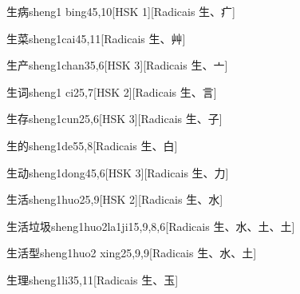 \begin{entry}{生病}{sheng1 bing4}{5,10}[HSK 1][Radicais ⽣、⽧]
\end{entry}

\begin{entry}{生菜}{sheng1cai4}{5,11}[Radicais ⽣、⾋]
\end{entry}

\begin{entry}{生产}{sheng1chan3}{5,6}[HSK 3][Radicais ⽣、⼇]
\end{entry}

\begin{entry}{生词}{sheng1 ci2}{5,7}[HSK 2][Radicais ⽣、⾔]
\end{entry}

\begin{entry}{生存}{sheng1cun2}{5,6}[HSK 3][Radicais ⽣、⼦]
\end{entry}

\begin{entry}{生的}{sheng1de5}{5,8}[Radicais ⽣、⽩]
\end{entry}

\begin{entry}{生动}{sheng1dong4}{5,6}[HSK 3][Radicais ⽣、⼒]
\end{entry}

\begin{entry}{生活}{sheng1huo2}{5,9}[HSK 2][Radicais ⽣、⽔]
\end{entry}

\begin{entry}{生活垃圾}{sheng1huo2la1ji1}{5,9,8,6}[Radicais ⽣、⽔、⼟、⼟]
\end{entry}

\begin{entry}{生活型}{sheng1huo2 xing2}{5,9,9}[Radicais ⽣、⽔、⼟]
\end{entry}

\begin{entry}{生理}{sheng1li3}{5,11}[Radicais ⽣、⽟]
\end{entry}

